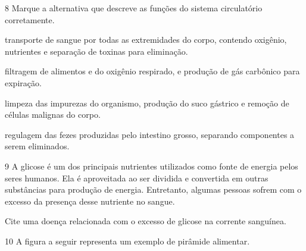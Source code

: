 \pagebreak
\num{8} Marque a alternativa que descreve as funções do sistema circulatório corretamente.

\begin{escolha}
\item transporte de sangue por todas as extremidades do corpo, contendo
oxigênio, nutrientes e separação de toxinas para eliminação.

\item filtragem de alimentos e do oxigênio respirado, e produção de gás
carbônico para expiração.

\item limpeza das impurezas do organismo, produção do suco gástrico e
remoção de células malignas do corpo.

\item regulagem das fezes produzidas pelo intestino grosso, separando
componentes a serem eliminados.
\end{escolha}



\num{9} A glicose é um dos principais nutrientes utilizados como
fonte de energia pelos seres humanos. Ela é aproveitada ao ser dividida
e convertida em outras substâncias para produção de energia. Entretanto,
algumas pessoas sofrem com o excesso da presença desse nutriente no
sangue.

Cite uma doença relacionada com o excesso de glicose na corrente
sanguínea.


\pagebreak
\num{10} A figura a seguir representa um exemplo de pirâmide
alimentar.


